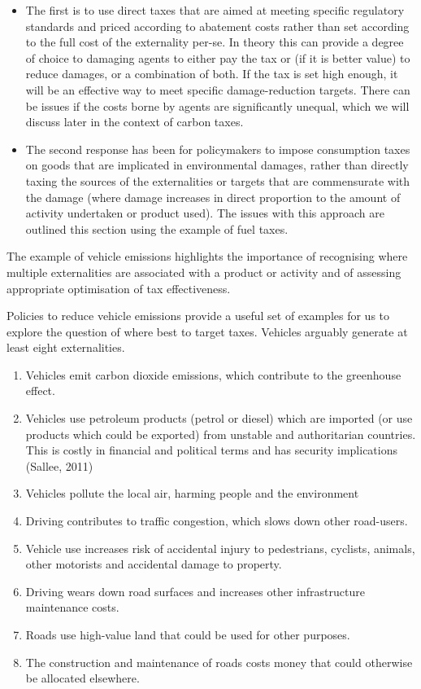 \documentclass[]{tufte-handout}
\providecommand{\tightlist}{%
  \setlength{\itemsep}{0pt}\setlength{\parskip}{0pt}}
\begin{document}
\begin{itemize}
\tightlist
\item
  The first is to use direct taxes that are aimed at meeting specific
  regulatory standards and priced according to abatement costs rather
  than set according to the full cost of the externality per-se. In
  theory this can provide a degree of choice to damaging agents to
  either pay the tax or (if it is better value) to reduce damages, or a
  combination of both. If the tax is set high enough, it will be an
  effective way to meet specific damage-reduction targets. There can be
  issues if the costs borne by agents are significantly unequal, which
  we will discuss later in the context of carbon taxes.
\item
  The second response has been for policymakers to impose consumption
  taxes on goods that are implicated in environmental damages, rather
  than directly taxing the sources of the externalities or targets that
  are commensurate with the damage (where damage increases in direct
  proportion to the amount of activity undertaken or product used). The
  issues with this approach are outlined this section using the example
  of fuel taxes.
\end{itemize}

The example of vehicle emissions highlights the importance of
recognising where multiple externalities are associated with a product
or activity and of assessing appropriate optimisation of tax
effectiveness.

Policies to reduce vehicle emissions provide a useful set of examples
for us to explore the question of where best to target taxes. Vehicles
arguably generate at least eight externalities.

\begin{enumerate}
\def\labelenumi{\arabic{enumi}.}
\tightlist
\item
  Vehicles emit carbon dioxide emissions, which contribute to the
  greenhouse effect.
\item
  Vehicles use petroleum products (petrol or diesel) which are imported
  (or use products which could be exported) from unstable and
  authoritarian countries. This is costly in financial and political
  terms and has security implications (Sallee, 2011)
\item
  Vehicles pollute the local air, harming people and the environment
\item
  Driving contributes to traffic congestion, which slows down other
  road-users.
\item
  Vehicle use increases risk of accidental injury to pedestrians,
  cyclists, animals, other motorists and accidental damage to property.
\item
  Driving wears down road surfaces and increases other infrastructure
  maintenance costs.
\item
  Roads use high-value land that could be used for other purposes.
\item
  The construction and maintenance of roads costs money that could
  otherwise be allocated elsewhere.
\end{enumerate}
\end{document}
